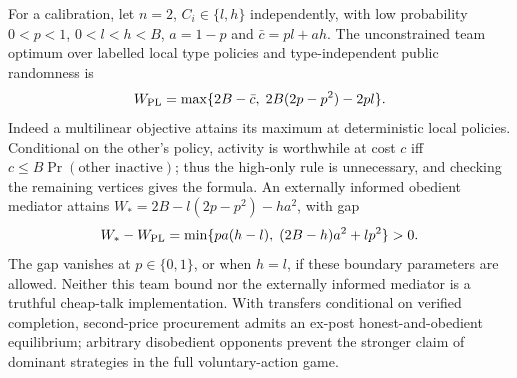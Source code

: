 For a calibration, let $n=2$, $C_i\in\{l,h\}$ independently, with low
probability $0<p<1$, $0<l<h<B$, $a=1-p$ and $\bar c=pl+ah$.
The unconstrained team optimum over labelled local type policies and
type-independent public randomness is
\[
 W_{\rm PL}=\max\{2B-\bar c,\;2B(2p-p^2)-2pl\}.
\]
Indeed a multilinear objective attains its maximum at deterministic local
policies. Conditional on the other's policy, activity is worthwhile at cost
$c$ iff $c\le B\Pr(\text{other inactive})$; thus the high-only rule is
unnecessary, and checking the remaining vertices gives the formula.
An externally informed obedient mediator attains
$W_*=2B-l(2p-p^2)-ha^2$, with gap
\[
 W_*-W_{\rm PL}
 =\min\{pa(h-l),\;(2B-h)a^2+lp^2\}>0.
\]
The gap vanishes at $p\in\{0,1\}$, or when $h=l$, if these boundary
parameters are allowed. Neither this team bound nor the externally informed mediator is a
truthful cheap-talk implementation. With transfers conditional on verified
completion, second-price procurement admits an ex-post honest-and-obedient
equilibrium; arbitrary disobedient opponents prevent the stronger claim of
dominant strategies in the full voluntary-action game.

